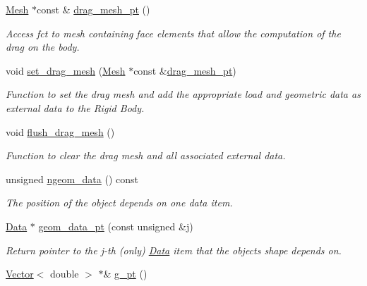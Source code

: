\begin{DoxyCompactItemize}
\hyperlink{classoomph_1_1Mesh}{Mesh} $\ast$const  \& \hyperlink{classoomph_1_1ImmersedRigidBodyElement_ab5570597c7962806448af56aac4ac3cd}{drag\+\_\+mesh\+\_\+pt} ()
\begin{DoxyCompactList}\small\item\em Access fct to mesh containing face elements that allow the computation of the drag on the body. \end{DoxyCompactList}\item 
void \hyperlink{classoomph_1_1ImmersedRigidBodyElement_adae3a4896f45d1fd08f3cd40fad0fdf4}{set\+\_\+drag\+\_\+mesh} (\hyperlink{classoomph_1_1Mesh}{Mesh} $\ast$const \&\hyperlink{classoomph_1_1ImmersedRigidBodyElement_ab5570597c7962806448af56aac4ac3cd}{drag\+\_\+mesh\+\_\+pt})
\begin{DoxyCompactList}\small\item\em Function to set the drag mesh and add the appropriate load and geometric data as external data to the Rigid Body. \end{DoxyCompactList}\item 
void \hyperlink{classoomph_1_1ImmersedRigidBodyElement_a2ee0f157b7a4f1b7ad89b3d45a4cf620}{flush\+\_\+drag\+\_\+mesh} ()
\begin{DoxyCompactList}\small\item\em Function to clear the drag mesh and all associated external data. \end{DoxyCompactList}\item 
unsigned \hyperlink{classoomph_1_1ImmersedRigidBodyElement_a4c5bf4b09a19ea70edf9ec68b41bfd2a}{ngeom\+\_\+data} () const
\begin{DoxyCompactList}\small\item\em The position of the object depends on one data item. \end{DoxyCompactList}\item 
\hyperlink{classoomph_1_1Data}{Data} $\ast$ \hyperlink{classoomph_1_1ImmersedRigidBodyElement_adf0e61dfcf35f8be55dab30dd8e0ccb5}{geom\+\_\+data\+\_\+pt} (const unsigned \&j)
\begin{DoxyCompactList}\small\item\em Return pointer to the j-\/th (only) \hyperlink{classoomph_1_1Data}{Data} item that the object\textquotesingle{}s shape depends on. \end{DoxyCompactList}\item 
\hyperlink{classoomph_1_1Vector}{Vector}$<$ double $>$ $\ast$\& \hyperlink{classoomph_1_1ImmersedRigidBodyElement_a190a93393aa431b18f996dfb4b007080}{g\+\_\+pt} ()

\end{DoxyCompactItemize}
